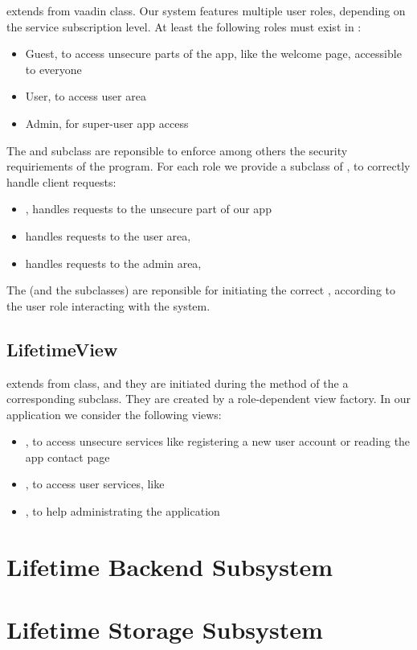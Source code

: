  extends from vaadin  class. Our system
features multiple user roles, depending on the service subscription
level. At least the following roles must exist in \lifetime:
\begin{itemize}
\item Guest, to access unsecure parts of the app, like the welcome
  page, accessible to everyone
\item User, to access user area
\item Admin, for super-user app access
\end{itemize}
%
The  and subclass are reponsible to enforce among
others the security requiriements of the program. For each role we
provide a subclass of , to correctly handle client
requests:
%
\begin{itemize}
\item {}, handles requests to the unsecure part of our
  app
\item {} handles requests to the user area,
\item {} handles requests to the admin area,
\end{itemize}
%
The  (and the subclasses) are reponsible for
initiating the correct , according to the user role
interacting with the system.

\subsection{LifetimeView}
\label{sec:lifetimeview}
 extends from \vaadin {} class, and
they are initiated during the  method of the a
corresponding  subclass. They are created by a
role-dependent view factory.
%
In our application we consider the following views:
\begin{itemize}
\item {}, to access unsecure services like registering
  a new user account or reading the app contact page
\item {}, to access user services, like \vitae
\item {}, to help administrating the application
\end{itemize}

\section{Lifetime Backend Subsystem}
\label{sec:backend}

\section{Lifetime Storage Subsystem}
\label{sec:storage}


